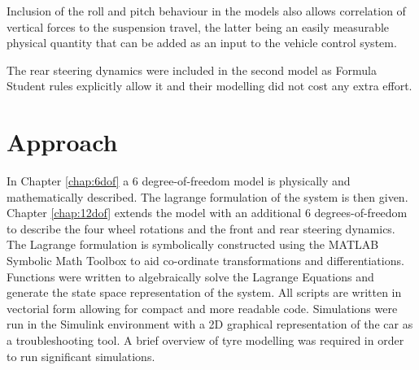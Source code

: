 Inclusion of the roll and pitch behaviour in the models also allows correlation of vertical forces to the suspension travel, the latter being an easily measurable physical quantity that can be added as an input to the vehicle control system.

The rear steering dynamics were included in the second model as Formula Student rules explicitly allow it and their modelling did not cost any extra effort.

\section{Approach}
\label{sec:approach}
In Chapter \ref{chap:6dof} a 6 degree-of-freedom model is physically and mathematically described. The lagrange formulation of the system is then given. Chapter \ref{chap:12dof} extends the model with an additional 6 degrees-of-freedom to describe the four wheel rotations and the front and rear steering dynamics.
The Lagrange formulation is symbolically constructed using the MATLAB Symbolic Math Toolbox to aid co-ordinate transformations and differentiations.
Functions were written to algebraically solve the Lagrange Equations and generate the state space representation of the system.
All scripts are written in vectorial form allowing for compact and more readable code.
Simulations were run in the Simulink environment with a 2D graphical representation of the car as a troubleshooting tool.
A brief overview of tyre modelling was required in order to run significant simulations.
